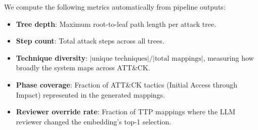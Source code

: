 We compute the following metrics automatically from pipeline outputs:

\begin{itemize}
    \item \textbf{Tree depth}: Maximum root-to-leaf path length per attack tree.
    \item \textbf{Step count}: Total attack steps across all trees.
    \item \textbf{Technique diversity}: $|\text{unique techniques}| / |\text{total mappings}|$, measuring how broadly the system maps across ATT\&CK.
    \item \textbf{Phase coverage}: Fraction of ATT\&CK tactics (Initial Access through Impact) represented in the generated mappings.
    \item \textbf{Reviewer override rate}: Fraction of TTP mappings where the LLM reviewer changed the embedding's top-1 selection.
\end{itemize}
